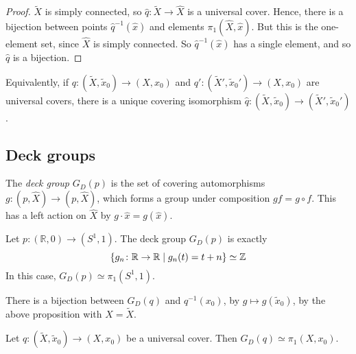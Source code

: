 \begin{proof}
	\( \widetilde X \) is simply connected, so \( \hat q \colon \widetilde X \to \hat X \) is a universal cover.
	Hence, there is a bijection between points \( \hat q^{-1}(\hat x) \) and elements \( \pi_1(\hat X, \hat x) \).
	But this is the one-element set, since \( \hat X \) is simply connected.
	So \( \hat q^{-1}(\hat x) \) has a single element, and so \( \hat q \) is a bijection.
\end{proof}
Equivalently, if \( q \colon (\widetilde X, \widetilde x_0) \to (X, x_0) \) and \( q' \colon (\widetilde X', \widetilde x_0') \to (X, x_0) \) are universal covers, there is a unique covering isomorphism \( \hat q \colon (\widetilde X, \widetilde x_0) \to (\widetilde X', \widetilde x_0') \).

\subsection{Deck groups}
\begin{definition}
	The \emph{deck group} \( G_D(p) \) is the set of covering automorphisms \( g \colon (p, \hat X) \to (p, \hat X) \), which forms a group under composition \( gf = g \circ f \).
	This has a left action on \( \hat X \) by \( g \cdot \hat x = g(\hat x) \).
\end{definition}
\begin{example}
	Let \( p \colon (\mathbb R, 0) \to (S^1, 1) \).
	The deck group \( G_D(p) \) is exactly
	\[ \qty{g_n \colon \mathbb R \to \mathbb R \mid g_n(t) = t + n} \simeq \mathbb Z \]
	In this case, \( G_D(p) \simeq \pi_1(S^1, 1) \).
\end{example}
\begin{example}
	There is a bijection between \( G_D(q) \) and \( q^{-1}(x_0) \), by \( g \mapsto g(\widetilde x_0) \), by the above proposition with \( \hat X = \widetilde X \).
\end{example}
\begin{theorem}
	Let \( q \colon (\widetilde X, \widetilde x_0) \to (X, x_0) \) be a universal cover.
	Then \( G_D(q) \simeq \pi_1(X,x_0) \).
\end{theorem}
